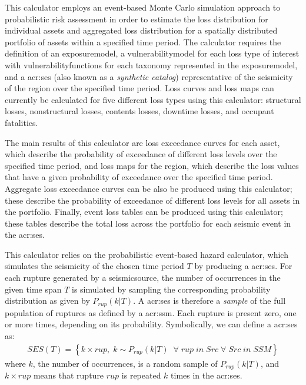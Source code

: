 This calculator employs an event-based Monte Carlo simulation approach to
probabilistic risk assessment in order to estimate the loss distribution for
individual \glspl{asset} and aggregated loss distribution for a spatially
distributed portfolio of \glspl{asset} within a specified time period. The
calculator requires the definition of an \gls{exposuremodel}, a
\gls{vulnerabilitymodel} for each loss type of interest with
\glspl{vulnerabilityfunction} for each taxonomy represented in the
\gls{exposuremodel}, and a \glsdesc{acr:ses} (also known as a
\textit{synthetic catalog}) representative of the seismicity of the region
over the specified time period. Loss curves and loss maps can currently be
calculated for five different loss types using this calculator: structural
losses, nonstructural losses, contents losses, downtime losses, and occupant
fatalities.

The main results of this calculator are loss
exceedance curves for each \gls{asset}, which describe the probability of
exceedance of different loss levels over the specified time period, and loss
maps for the region, which describe the loss values that have a given
probability of exceedance over the specified time period. Aggregate loss
exceedance curves can be also be produced using this calculator; these
describe the probability of exceedance of different loss levels for all
\glspl{asset} in the portfolio. Finally, event loss tables can be produced
using this calculator; these tables describe the total loss across the
portfolio for each seismic event in the \gls{acr:ses}.

This calculator relies on the probabilistic event-based hazard calculator,
which simulates the seismicity of the chosen time period $T$ by producing a
\gls{acr:ses}. For each \gls{rupture} generated by a \gls{seismicsource}, the
number of occurrences in the given time span $T$ is simulated by sampling the
corresponding probability distribution as given by $P_{rup}(k | T)$. A
\gls{acr:ses} is therefore a \textit{sample} of the full population of
\glspl{rupture} as defined by a \glsdesc{acr:ssm}. Each \gls{rupture} is
present zero, one or more times, depending on its probability. Symbolically,
we can define a \gls{acr:ses} as:
\begin{align}
SES(T) = \left\{k \times rup,\;k\sim P_{rup}(k | T)\;\;\forall\;rup\;in\;Src\;\forall\;Src\;in\;SSM\right\}
\end{align}
where $k$, the number of occurrences, is a random sample of $P_{rup}(k | T)$,
and $k \times rup$ means that \gls{rupture} $rup$ is repeated $k$ times in the
\gls{acr:ses}.

